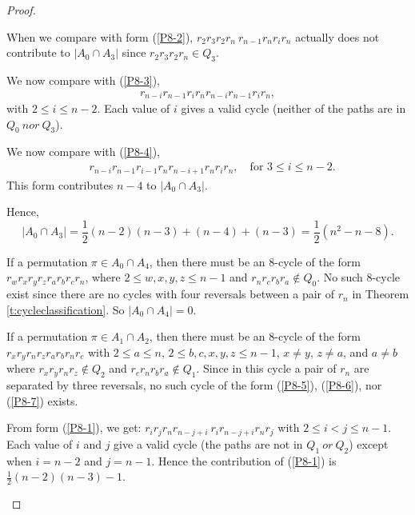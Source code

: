 \documentclass[final]{dmtcs-episciences}
\numberwithin{equation}{section}
\begin{document}
\begin{proof}
\begin{description}
When we compare with form (\ref{P8-2}),
    $r_{2}r_{3}r_{2}r_{n}\ r_{n-1}r_{n}r_{i}r_{n}$
actually does not contribute to $|A_0\cap A_3|$ since $r_{2}r_{3}r_{2}r_{n}\in Q_3$.

We now compare with (\ref{P8-3}),
\begin{align*}
    r_{n-i}r_{n-1}r_{i}r_{n}r_{n-i}r_{n-1}r_{i}r_{n},
\end{align*}
with $ 2 \leq i \leq n-2$. Each value of $i$ gives a valid cycle (neither of the paths are in $Q_0 \ nor \ Q_3$). 


We now compare with (\ref{P8-4}),
\begin{align*}
    &r_{n-i}r_{n-1}r_{i-1}r_{n}r_{n-i+1}r_{n}r_{i}r_{n}, \quad \text{for } 3 \leq i \leq n-2.
\end{align*}
This form contributes $n-4$ to $|A_0 \cap A_3|$. 

Hence, \begin{displaymath}|A_0 \cap A_3| = \frac{1}{2}(n-2)(n-3) + (n-4) +(n-3) = \frac{1}{2}(n^2 - n - 8). \end{displaymath}

\item[$|A_0 \cap A_4|$.] If a permutation $\pi \in A_0 \cap A_4$, then there must be an 8-cycle of the form $r_w r_x r_y r_z r_a r_b r_c r_n$, where $2 \leq w,x,y,z \leq n-1$ and $r_n r_c r_b r_a \notin Q_0$. No such 8-cycle exist since %
there are no cycles with four reversals between a pair of $r_{n}$ in Theorem \ref{t:cycleclassification}. So $|A_0 \cap A_4|=0$.


\item[$|A_1 \cap A_2|$.] If a permutation $\pi \in A_1 \cap A_2$, then there must be an 8-cycle of the form $r_x r_y r_n r_z r_a r_b r_n r_c$ with $2 \leq a \leq n$, $2 \leq b,c,x,y,z \leq n-1$, $x \neq y$, $z \neq a$, and $a \neq b$ where $r_x r_y r_n r_z \notin Q_2$ and $r_c r_n r_b r_a \notin Q_1$. %
Since in this cycle a pair of $r_{n}$ are separated by three reversals, no such cycle of the form (\ref{P8-5}), (\ref{P8-6}), nor (\ref{P8-7}) exists.

From form (\ref{P8-1}), we get: $r_{i}r_{j}r_{n}r_{n-j+i} \ r_{i}r_{n-j+i}r_{n}r_{j}$ with $2 \leq i < j \leq n-1$. Each value of $i$ and $j$ give a valid cycle (the paths are not in $Q_1 \ or \ Q_2$) except when $i=n-2$ and $j=n-1$. Hence the contribution of (\ref{P8-1}) is $\frac{1}{2}(n-2)(n-3)-1$. 


\end{description}
\end{proof}
\end{document}
